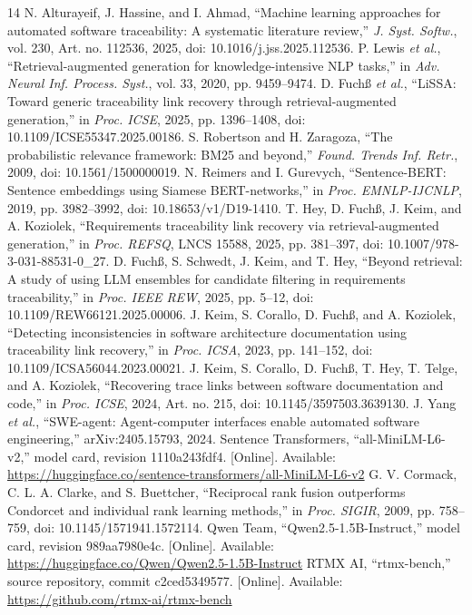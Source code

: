 \documentclass[conference,letterpaper,10pt]{IEEEtran}
\begin{document}
\begin{thebibliography}{14}
 N. Alturayeif, J. Hassine, and I. Ahmad, ``Machine learning approaches for automated software traceability: A systematic literature review,'' \emph{J. Syst. Softw.}, vol. 230, Art. no. 112536, 2025, doi: 10.1016/j.jss.2025.112536.
 P. Lewis \emph{et al.}, ``Retrieval-augmented generation for knowledge-intensive NLP tasks,'' in \emph{Adv. Neural Inf. Process. Syst.}, vol. 33, 2020, pp. 9459--9474.
 D. Fuch\ss{} \emph{et al.}, ``LiSSA: Toward generic traceability link recovery through retrieval-augmented generation,'' in \emph{Proc. ICSE}, 2025, pp. 1396--1408, doi: 10.1109/ICSE55347.2025.00186.
 S. Robertson and H. Zaragoza, ``The probabilistic relevance framework: BM25 and beyond,'' \emph{Found. Trends Inf. Retr.}, 2009, doi: 10.1561/1500000019.
 N. Reimers and I. Gurevych, ``Sentence-BERT: Sentence embeddings using Siamese BERT-networks,'' in \emph{Proc. EMNLP-IJCNLP}, 2019, pp. 3982--3992, doi: 10.18653/v1/D19-1410.
 T. Hey, D. Fuch\ss{}, J. Keim, and A. Koziolek, ``Requirements traceability link recovery via retrieval-augmented generation,'' in \emph{Proc. REFSQ}, LNCS 15588, 2025, pp. 381--397, doi: 10.1007/978-3-031-88531-0\_27.
 D. Fuch\ss{}, S. Schwedt, J. Keim, and T. Hey, ``Beyond retrieval: A study of using LLM ensembles for candidate filtering in requirements traceability,'' in \emph{Proc. IEEE REW}, 2025, pp. 5--12, doi: 10.1109/REW66121.2025.00006.
 J. Keim, S. Corallo, D. Fuch\ss{}, and A. Koziolek, ``Detecting inconsistencies in software architecture documentation using traceability link recovery,'' in \emph{Proc. ICSA}, 2023, pp. 141--152, doi: 10.1109/ICSA56044.2023.00021.
 J. Keim, S. Corallo, D. Fuch\ss{}, T. Hey, T. Telge, and A. Koziolek, ``Recovering trace links between software documentation and code,'' in \emph{Proc. ICSE}, 2024, Art. no. 215, doi: 10.1145/3597503.3639130.
 J. Yang \emph{et al.}, ``SWE-agent: Agent-computer interfaces enable automated software engineering,'' arXiv:2405.15793, 2024.
 Sentence Transformers, ``all-MiniLM-L6-v2,'' model card, revision 1110a243fdf4. [Online]. Available: \url{https://huggingface.co/sentence-transformers/all-MiniLM-L6-v2}
 G. V. Cormack, C. L. A. Clarke, and S. Buettcher, ``Reciprocal rank fusion outperforms Condorcet and individual rank learning methods,'' in \emph{Proc. SIGIR}, 2009, pp. 758--759, doi: 10.1145/1571941.1572114.
 Qwen Team, ``Qwen2.5-1.5B-Instruct,'' model card, revision 989aa7980e4c. [Online]. Available: \url{https://huggingface.co/Qwen/Qwen2.5-1.5B-Instruct}
 RTMX AI, ``rtmx-bench,'' source repository, commit c2ced5349577. [Online]. Available: \url{https://github.com/rtmx-ai/rtmx-bench}
\end{thebibliography}
\end{document}
